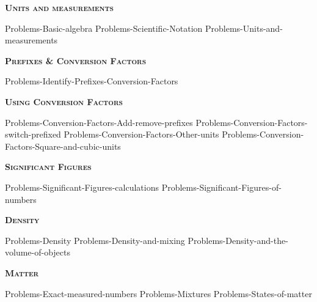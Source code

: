 \documentclass[main.tex]{subfiles}
\newcommand\chapterlabel{Ch-measurements}
\begin{document}
\newpage
\setdoublesep{0.35700 em}  %
\setatomsep{1.78500 em}    %
\setbondoffset{0.18265 em} %
\newcommand{\bondwidth}{0.06642 em} %
\setbondstyle{line width = \bondwidth}
\fancyhfoffset[E,O]{0pt}
\setlength{\columnsep}{30pt}
\begin{conclusion}
\end{conclusion}
\begin{multicols*}{2}\setcounter{numA}{1}



{\raggedright\textsc{\textbf{Units and measurements }}\par}
{Problems-Basic-algebra}
{Problems-Scientific-Notation}
{Problems-Units-and-measurements}


{\raggedright\textsc{\textbf{Prefixes \& Conversion Factors }}\par}
{Problems-Identify-Prefixes-Conversion-Factors}




{\raggedright\textsc{\textbf{Using Conversion Factors }}\par}
{Problems-Conversion-Factors-Add-remove-prefixes}
{Problems-Conversion-Factors-switch-prefixed}
{Problems-Conversion-Factors-Other-units}
{Problems-Conversion-Factors-Square-and-cubic-units}
{\raggedright\textsc{\textbf{Significant Figures }}\par}
{Problems-Significant-Figures-calculations}
{Problems-Significant-Figures-of-numbers}
{\raggedright\textsc{\textbf{Density}}\par}
{Problems-Density}
{Problems-Density-and-mixing}
{Problems-Density-and-the-volume-of-objects}
{\raggedright\textsc{\textbf{Matter}}\par}
{Problems-Exact-measured-numbers}
{Problems-Mixtures}
{Problems-States-of-matter}











\end{multicols*}
\end{document}
